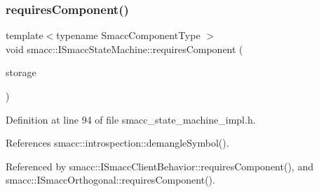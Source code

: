 \subsubsection{\texorpdfstring{requires\+Component()}{requiresComponent()}}
{\footnotesize\ttfamily template$<$typename Smacc\+Component\+Type $>$ \\
void smacc\+::\+I\+Smacc\+State\+Machine\+::requires\+Component (\begin{DoxyParamCaption}\item[{Smacc\+Component\+Type $\ast$\&}]{storage }\end{DoxyParamCaption})}



Definition at line 94 of file smacc\+\_\+state\+\_\+machine\+\_\+impl.\+h.



References smacc\+::introspection\+::demangle\+Symbol().



Referenced by smacc\+::\+I\+Smacc\+Client\+Behavior\+::requires\+Component(), and smacc\+::\+I\+Smacc\+Orthogonal\+::requires\+Component().


